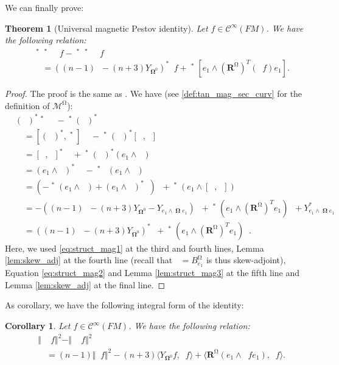 \documentclass[12pt]{amsart}
\numberwithin{numbering}{section}
\theoremstyle{plain}
\newtheorem{thm}[numbering]{Theorem}
\newtheorem{csq}[numbering]{Corollary}
\theoremstyle{definition}
\theoremstyle{remark}
\numberwithin{equation}{section}
\DeclareMathOperator{\nv}{\nabla_{\mathbb{V}}}
\DeclareMathOperator{\nhs}{\nabla_{\mathbb{H}^{\mg}}}
\DeclareMathOperator{\xs}{\mathbb{X}^{\mg}}
\DeclareMathOperator{\oo}{\mathbf{\Omega}}
\DeclareMathOperator{\mg}{\Omega}
\newcommand{\rsfm}{\mathbf{R}^{\mg}}
\begin{document}
We can finally prove: 
\begin{thm}[Universal magnetic Pestov identity] \label{thm:univ_mag_pestov}
Let $f \in \mathcal{C}^\infty(FM)$. We have the following relation:
\begin{align*}
&\xs^* \nv^* \nv \xs f - \nv^* \xs^* \xs \nv f \\ 
&\quad = ((n-1) \xs - (n+3) Y_{\oo^0})^* \xs f + \nv^* [e_1 \wedge (\rsfm)^T(\nv f) e_1].
\end{align*}
\end{thm}

\begin{proof}
The proof is the same as \cite[Proposition 3.2]{cekic2025pestov}. We have (see \ref{def:tan_mag_sec_curv} for the definition of $\mathcal{M}^{\mg}$):
\begin{align*}
&(\xs)^* \nv^* \nv \xs - \nv^* (\xs)^* \xs \nv \\ 
&\quad = [(\xs)^*, \nv^*] \nv \xs - \nv^* (\xs)^* [\xs, \nv] \\ 
&\quad = [\nv, \xs]^* \nv \xs + \nv^* (\xs)^* (e_1 \wedge \nhs) \\ 
&\quad = (e_1 \wedge\nhs)^* \nv \xs - \nv^* \xs (e_1 \wedge \nhs) \\ 
&\quad = (-\nv^* (e_1 \wedge \nhs) + (e_1 \wedge \nhs)^* \nv) \xs + \nv^* (e_1 \wedge [\nhs, \xs]) \\ 
&\quad = - ((n-1) \xs - (n+3) Y_{\oo^0} - Y_{e_1 \wedge \oo e_1}) \xs + \nv^* (e_1 \wedge (\rsfm)^T e_1) \nv + Y_{e_1 \wedge \oo e_1}^* \xs \\ 
&\quad = ((n-1) \xs - (n+3) Y_{\oo^0})^* \xs + \nv^* (e_1 \wedge (\rsfm)^T e_1) \nv.
\end{align*}
Here, we used \eqref{eq:struct_mag1} at the third and fourth lines, Lemma \ref{lem:skew_adj} at the fourth line (recall that $\xs = B_{e_1}^{\mg}$ is thus skew-adjoint), Equation \eqref{eq:struct_mag2} and Lemma \ref{lem:struct_mag3} at the fifth line and Lemma \ref{lem:skew_adj} at the final line.
\end{proof}

As corollary, we have the following integral form of the identity:
\begin{csq} \label{thm:int_univ_mag_pestov}
Let $f \in \mathcal{C}^\infty(FM)$. We have the following relation:
\begin{align*}
&\Vert \nv \xs f \Vert^2 - \Vert \xs \nv f \Vert^2 \\ 
&\quad = (n-1) \Vert \xs f \Vert^2 - (n+3) \langle Y_{\oo^0} f, \xs f \rangle + \langle \rsfm(e_1 \wedge \nv f e_1), \nv f \rangle.
\end{align*}
\end{csq}
\end{document}
